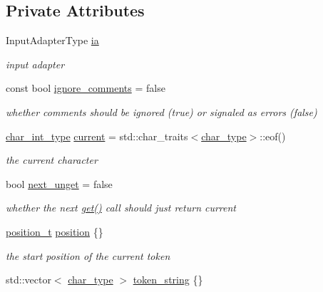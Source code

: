 \subsection*{Private Attributes}
\begin{DoxyCompactItemize}
\item 
Input\+Adapter\+Type \hyperlink{classnlohmann_1_1detail_1_1lexer_a526d001dd91ec55b8032ba98466765c0}{ia}
\begin{DoxyCompactList}\small\item\em input adapter \end{DoxyCompactList}\item 
const bool \hyperlink{classnlohmann_1_1detail_1_1lexer_a11528814930243028ac5b8901f4a17d7}{ignore\+\_\+comments} = false
\begin{DoxyCompactList}\small\item\em whether comments should be ignored (true) or signaled as errors (false) \end{DoxyCompactList}\item 
\hyperlink{classnlohmann_1_1detail_1_1lexer_a46612a81a07dbbc6daef870ca4f959e4}{char\+\_\+int\+\_\+type} \hyperlink{classnlohmann_1_1detail_1_1lexer_a40bd85d91d377ade9ccb910e35776c22}{current} = std\+::char\+\_\+traits$<$\hyperlink{classnlohmann_1_1detail_1_1lexer_a98c69ad433d971104288baef813b2c68}{char\+\_\+type}$>$\+::eof()
\begin{DoxyCompactList}\small\item\em the current character \end{DoxyCompactList}\item 
bool \hyperlink{classnlohmann_1_1detail_1_1lexer_a40b108a0e45a7253f6ad85fbdaa6a262}{next\+\_\+unget} = false
\begin{DoxyCompactList}\small\item\em whether the next \hyperlink{classnlohmann_1_1detail_1_1lexer_a9cd3e4cf04d19be521beb8868c1a2fc9}{get()} call should just return current \end{DoxyCompactList}\item 
\hyperlink{structnlohmann_1_1detail_1_1position__t}{position\+\_\+t} \hyperlink{classnlohmann_1_1detail_1_1lexer_a8a1bda107ce1622c0cb3174fa12155ea}{position} \{\}
\begin{DoxyCompactList}\small\item\em the start position of the current token \end{DoxyCompactList}\item 
std\+::vector$<$ \hyperlink{classnlohmann_1_1detail_1_1lexer_a98c69ad433d971104288baef813b2c68}{char\+\_\+type} $>$ \hyperlink{classnlohmann_1_1detail_1_1lexer_a94aec416b883f742ba7f20bd16adb3c3}{token\+\_\+string} \{\}

\end{DoxyCompactItemize}
